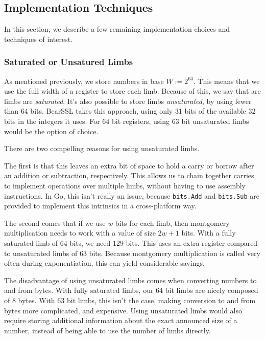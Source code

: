\documentclass[11pt, a4paper]{article} %
\begin{document}
{\subsection{Implementation Techniques}

In this section, we describe a few remaining implementation choices
and techniques of interest.

\subsubsection{Saturated or Unsatured Limbs}

As mentioned previously, we store numbers in base
$W := 2^{64}$. This means that we use the full width of a register
to store each limb. Because of this, we say that are limbs
are \emph{saturated}. It's also possible to store
limbs \emph{unsaturated}, by using fewer than $64$ bits.
BearSSL 
\cite{pornin_bearssl_2020-1}
takes this approach, using only $31$ bits of the available $32$ bits
in the integers it uses. For $64$ bit registers, using $63$ bit unsaturated
limbs would be the option of choice.

There are two compelling reasons for using unsaturated limbs.

The first is that this leaves an extra bit of space to hold a carry
or borrow after an addition or subtraction, respectively. This allows
us to chain together carries to implement operations over multiple
limbs, without having to use assembly instructions. In Go,
this isn't really an issue, because \texttt{bits.Add} and
\texttt{bits.Sub} are provided to implement this intrinsics
in a cross-platform way.

The second comes that if we use $w$ bits for each limb, then montgomery
multiplication needs to work with a value of size $2w + 1$ bits. With a fully
saturated limb of $64$ bits, we need $129$ bits. This uses
an extra register compared to unsaturated limbs of $63$ bits. Because
montgomery multiplication is called very often during exponentiation,
this can yield considerable savings.

The disadvantage of using unsaturated limbs comes when converting
numbers to and from bytes. With fully saturated limbs, our
$64$ bit limbs are nicely composed of $8$ bytes. With $63$ bit limbs,
this isn't the case, making conversion to and from bytes more
complicated, and expensive. Using unsaturated limbs would
also require storing additional information about the exact
announced size of a number, instead of being able to use
the number of limbs directly.

}
\end{document}
